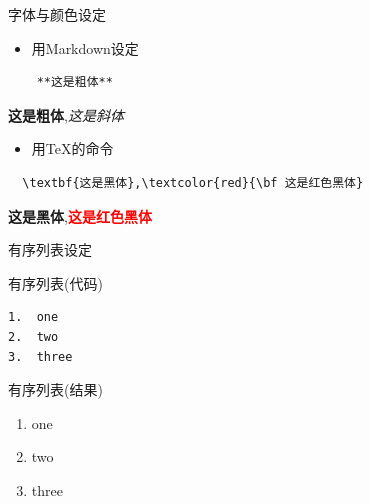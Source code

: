 \documentclass[
  12pt,
  ignorenonframetext,
  aspectratio=169, 12pt,table,t,utf-8]{beamer}
\providecommand{\tightlist}{%
  \setlength{\itemsep}{0pt}\setlength{\parskip}{0pt}}
\begin{document}
\begin{frame}[fragile]{字体与颜色设定}
\protect\hypertarget{ux5b57ux4f53ux4e0eux989cux8272ux8bbeux5b9a}{}
\begin{itemize}
\tightlist
\item
  用Markdown设定
\end{itemize}

\begin{verbatim}
    **这是粗体**
\end{verbatim}

\textbf{这是粗体},\emph{这是斜体}

\begin{itemize}
\tightlist
\item
  用\TeX{}的命令
\end{itemize}

\begin{verbatim}
  \textbf{这是黑体},\textcolor{red}{\bf 这是红色黑体}
\end{verbatim}

\textbf{这是黑体},\textcolor{red}{\bf 这是红色黑体}
\end{frame}

\begin{frame}[fragile]{有序列表设定}
\protect\hypertarget{ux6709ux5e8fux5217ux8868ux8bbeux5b9a}{}
\begin{block}{有序列表(代码)}
\protect\hypertarget{ux6709ux5e8fux5217ux8868ux4ee3ux7801}{}
\begin{verbatim}
1.  one
2.  two
3.  three
\end{verbatim}
\end{block}

\begin{block}{有序列表(结果)}
\protect\hypertarget{ux6709ux5e8fux5217ux8868ux7ed3ux679c}{}
\begin{enumerate}
\tightlist
\item
  one
\item
  two
\item
  three
\end{enumerate}
\end{block}
\end{frame}
\end{document}
